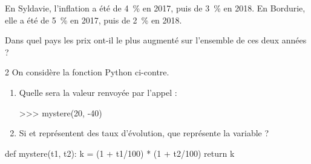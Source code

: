 \exo

En Syldavie, l'inflation a été de \SI[retain-explicit-plus]{4}{\percent} en 2017, puis de \SI[retain-explicit-plus]{3}{\percent} en 2018. En Bordurie, elle a été de \SI[retain-explicit-plus]{5}{\percent} en 2017, puis de \SI[retain-explicit-plus]{2}{\percent} en 2018.

Dans quel pays les prix ont-il le plus augmenté sur l'ensemble de ces deux années ?

\exo

\vspace{-12pt}
\setlength{\columnsep}{1cm}
\setlength{\columnseprule}{0pt}
\begin{multicols}{2}
On considère la fonction Python ci-contre.
\begin{enumerate}
\item Quelle sera la valeur renvoyée par l'appel :
\begin{pythonconsole}
>>> mystere(20, -40)
\end{pythonconsole}
\item Si  et  représentent des taux d'évolution, que représente la variable  ?
\end{enumerate}
\columnbreak
\begin{pythoncodenumligne}
def mystere(t1, t2):
    k = (1 + t1/100) * (1 + t2/100)
    return k
\end{pythoncodenumligne}
\end{multicols}
\vspace{-12pt}

\exo

